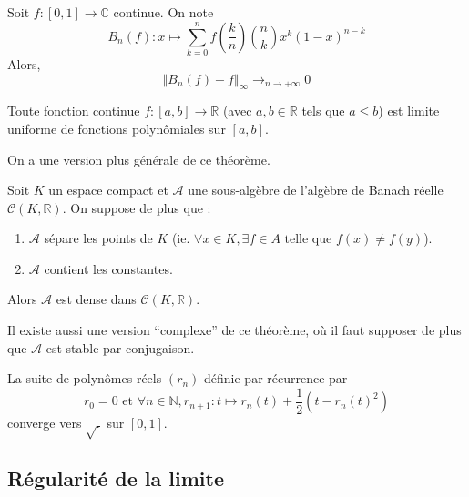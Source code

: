 
  \begin{theorem}[Bernstein]
    Soit $f : [0,1] \rightarrow \mathbb{C}$ continue. On note
    \[ B_n(f) : x \mapsto \sum_{k=0}^{n} f\left(\frac{k}{n}\right) \binom{n}{k} x^k (1-x)^{n-k} \]
    Alors,
    \[ \Vert B_n(f) - f \Vert_\infty \longrightarrow_{n \rightarrow +\infty} 0 \]
  \end{theorem}


  \begin{corollary}[Weierstrass]
    Toute fonction continue $f : [a,b] \rightarrow \mathbb{R}$ (avec $a, b \in \mathbb{R}$ tels que $a \leq b$) est limite uniforme de fonctions polynômiales sur $[a, b]$.
  \end{corollary}

  On a une version plus générale de ce théorème.


  \begin{theorem}
    Soit $K$ un espace compact et $\mathcal{A}$ une sous-algèbre de l'algèbre de Banach réelle $\mathcal{C}(K, \mathbb{R})$. On suppose de plus que :
    \begin{enumerate}[label=(\roman*)]
      \item $\mathcal{A}$ sépare les points de $K$ (ie. $\forall x \in K, \exists f \in A \text{ telle que } f(x) \neq f(y)$).
      \item $\mathcal{A}$ contient les constantes.
    \end{enumerate}
    Alors $\mathcal{A}$ est dense dans $\mathcal{C}(K, \mathbb{R})$.
  \end{theorem}

  \begin{remark}
    Il existe aussi une version ``complexe'' de ce théorème, où il faut supposer de plus que $\mathcal{A}$ est stable par conjugaison.
  \end{remark}

  \begin{example}
    La suite de polynômes réels $(r_n)$ définie par récurrence par
    \[ r_0 = 0 \text{ et } \forall n \in \mathbb{N}, r_{n+1} : t \mapsto r_n(t) + \frac{1}{2} (t - r_n(t)^2) \]
    converge vers $\sqrt{.}$ sur $[0,1]$.
  \end{example}

  \subsection{Régularité de la limite}

